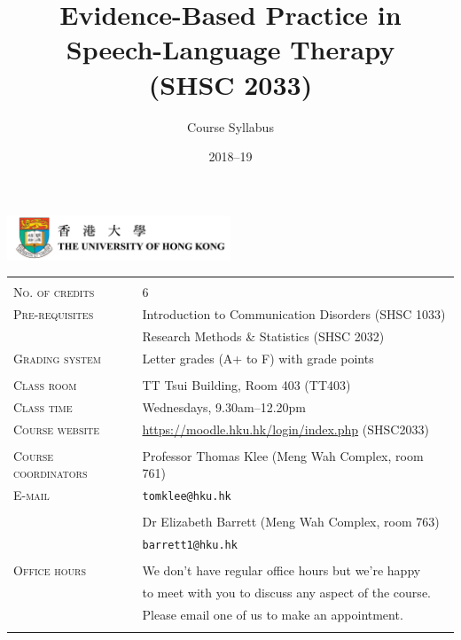 \documentclass[a4paper, 11pt]{article}
\title{Evidence-Based Practice in Speech-Language Therapy \\ (SHSC 2033)}
\author{Course Syllabus}
\date{2018--19}
\newcommand{\blankline}{\quad\pagebreak[2]}
\begin{document}
\maketitle

\begin{center}
\includegraphics[width=0.5\textwidth]{logo_CE_C.jpg}
\end{center}

\blankline


\begin{center}
\begin {tabular}{l l}
\hline
\\
	\textsc{No. of credits} & 6 \\
	\textsc{Pre-requisites} &  Introduction to Communication Disorders (SHSC 1033) \\
		& Research Methods \& Statistics (SHSC 2032) \\
	\textsc{Grading system} & Letter grades (A+ to F) with grade points \\
	\\
	\textsc{Class room} & TT Tsui Building, Room 403 (TT403) \\
	\textsc{Class time} & Wednesdays, 9.30am--12.20pm \\
	\textsc{Course website} & \url{https://moodle.hku.hk/login/index.php} (SHSC2033)  \\ 
	\\
	\textsc{Course coordinators} & Professor Thomas Klee (Meng Wah Complex, room 761) \\
	\textsc{E-mail} &  \texttt{tomklee@hku.hk} \\
 		\\
		& Dr Elizabeth Barrett (Meng Wah Complex, room 763) \\
	& \texttt{barrett1@hku.hk} \\
	\\
	\textsc{Office hours} & We don't have regular office hours but we're happy \\
	& to meet with you to discuss any aspect of the course. \\
	& Please email one of us to make an appointment.  \\
\\
\hline
\end{tabular}
\end{center}
\end{document}
